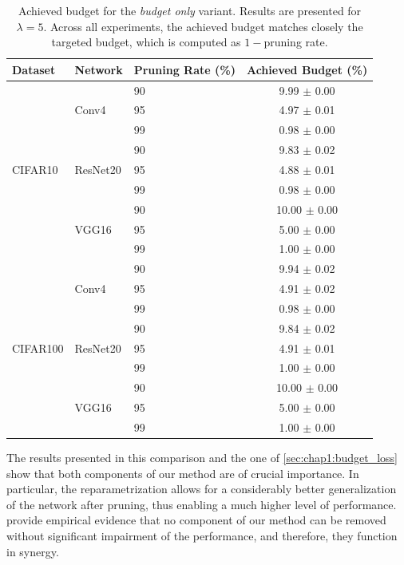 \begin{table}
\centering
\begin{tabular}{lllc}
  \toprule
  \textbf{Dataset} & \textbf{Network} & \textbf{Pruning Rate} (\%) &
  \textbf{Achieved Budget} (\%) \\
  \midrule
  \multirow{9}{*}{CIFAR10} & \multirow{3}{*}{Conv4} & 90 & 9.99 $\pm$ 0.00 \\
     &  & 95 & 4.97 $\pm$ 0.01 \\
     &  & 99 & 0.98 $\pm$ 0.00 \\
     \cline{2-4}
   & \multirow{3}{*}{ResNet20} & 90 & 9.83 $\pm$ 0.02 \\
     &  & 95 & 4.88 $\pm$ 0.01 \\
     &  & 99 & 0.98 $\pm$ 0.00 \\
     \cline{2-4}

   & \multirow{3}{*}{VGG16} & 90 & 10.00 $\pm$ 0.00 \\
     &  & 95 & 5.00 $\pm$ 0.00 \\
    &  & 99 & 1.00 $\pm$ 0.00 \\
    \midrule
  \multirow{9}{*}{CIFAR100} & \multirow{3}{*}{Conv4} & 90 & 9.94 $\pm$ 0.02 \\
     &  & 95 & 4.91 $\pm$ 0.02 \\
    &  & 99 & 0.98 $\pm$ 0.00 \\
    \cline{2-4}

   & \multirow{3}{*}{ResNet20} & 90 & 9.84 $\pm$ 0.02 \\
     &  & 95 & 4.91 $\pm$ 0.01 \\
     &  & 99 & 1.00 $\pm$ 0.00 \\
     \cline{2-4}

   & \multirow{3}{*}{VGG16} & 90 & 10.00 $\pm$ 0.00 \\
     &  & 95 & 5.00 $\pm$ 0.00 \\
    &  & 99 & 1.00 $\pm$ 0.00 \\
  \bottomrule
  \end{tabular}
  \caption{Achieved budget for the \emph{budget only} variant. Results are
  presented for $\lambda=5$. Across all experiments, the achieved budget matches
  closely the targeted budget, which is computed as $1-$pruning
  rate.}
  \label{tab:chap1:impact_of_reparametrisation}
\end{table}



The results presented in this comparison and the one of
\cref{sec:chap1:budget_loss} show that both components of our method are of
crucial importance. In particular, the reparametrization allows for a
considerably better generalization of the network after pruning, thus enabling a
much higher level of performance.
provide empirical evidence that no component of our method can be removed
without significant impairment of the performance, and therefore, they
function in synergy.


